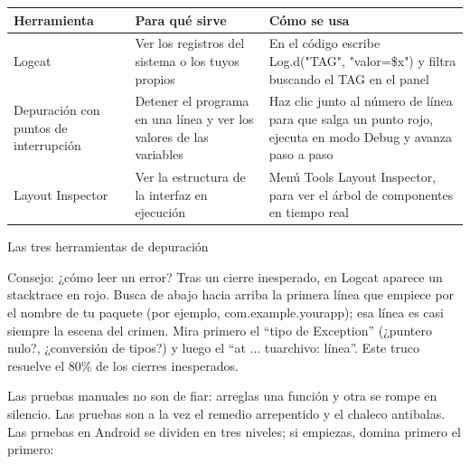 


\begin{center}
\begin{tabularx}{\linewidth}{|X|X|X|}
\hline
\textbf{Herramienta} & \textbf{Para qué sirve} & \textbf{Cómo se usa} \tabularnewline
\hline
Logcat & Ver los registros del sistema o los tuyos propios & En el código escribe Log.d("TAG", "valor=\$x") y filtra buscando el TAG en el panel \tabularnewline
Depuración con puntos de interrupción & Detener el programa en una línea y ver los valores de las variables & Haz clic junto al número de línea para que salga un punto rojo, ejecuta en modo Debug y avanza paso a paso \tabularnewline
Layout Inspector & Ver la estructura de la interfaz en ejecución & Menú Tools Layout Inspector, para ver el árbol de componentes en tiempo real \tabularnewline
\hline
\end{tabularx}
\end{center}

\begin{center}\small\color{gray}Las tres herramientas de depuración\end{center}

\begin{tcbinfo}{Consejo: ¿cómo leer un error?}
Tras un cierre inesperado, en Logcat aparece un stacktrace en rojo. Busca de abajo hacia arriba la primera línea que empiece por el nombre de tu paquete (por ejemplo, com.example.yourapp); esa línea es casi siempre la escena del crimen. Mira primero el “tipo de Exception” (¿puntero nulo?, ¿conversión de tipos?) y luego el “at ... tuarchivo: línea”. Este truco resuelve el 80\% de los cierres inesperados.

\end{tcbinfo}


Las pruebas manuales no son de fiar: arreglas una función y otra se rompe en silencio. Las pruebas son a la vez el remedio arrepentido y el chaleco antibalas. Las pruebas en Android se dividen en tres niveles; si empiezas, domina primero el primero:

